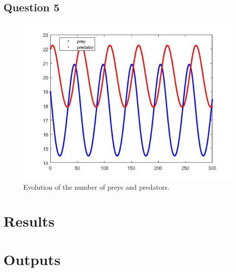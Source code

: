 \documentclass[a4paper, 11pt]{article}
\begin{document}
		
		\subsection*{Question 5}
		
		\begin{figure}[H]
			\centering
			\includegraphics[width=\linewidth]{ex5.jpg}
			\caption{Evolution of the number of preys and predators.}
			\label{fig:ex5}
		\end{figure}

	
	\section*{Results}
	
	
	\section*{Outputs}
	
	
	
\end{document}

